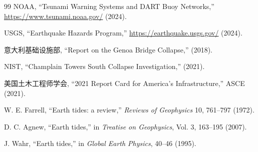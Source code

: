 \documentclass[12pt,a4paper]{article}
\theoremstyle{remark}
\begin{document}
\begin{thebibliography}{99}
		NOAA, “Tsunami Warning Systems and DART Buoy Networks,” \url{https://www.tsunami.noaa.gov/} (2024).
		
		USGS, “Earthquake Hazards Program,” \url{https://earthquake.usgs.gov/} (2024).
		
		意大利基础设施部, “Report on the Genoa Bridge Collapse,” (2018).
		
		NIST, “Champlain Towers South Collapse Investigation,” (2021).
		
		美国土木工程师学会, “2021 Report Card for America's Infrastructure,” ASCE (2021).
		
		W. E. Farrell, “Earth tides: a review,” \emph{Reviews of Geophysics} 10, 761–797 (1972).
		
		D. C. Agnew, “Earth tides,” in \emph{Treatise on Geophysics}, Vol. 3, 163–195 (2007).
		
		J. Wahr, “Earth tides,” in \emph{Global Earth Physics}, 40–46 (1995).
		
	\end{thebibliography}	
\end{document}
